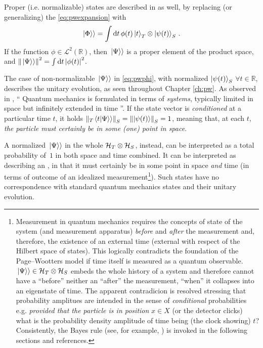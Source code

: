 Proper (i.e. normalizable) states are described in \citereset\cite{Lloyd:Time} as well, by replacing (or generalizing)
the \eqref{eq:pwexpansion} with
\begin{equation}\label{eq:pwphi}
  \left.\left| \Phi \right\rangle\right\rangle =
    \int \dd{t} \phi(t) \ket{t}_T \otimes \ket{\psi(t)}_S \, \text{.}
\end{equation}
If the function $\phi \in \mathscr{L}^2(\mathbb{R})$,
then $\left.\left| \Psi \right\rangle\right\rangle$ is a proper element of the product space,
and $\norm{\left.\left| \Psi \right\rangle\right\rangle}^2 = \int \dd{t} \abs{\phi(t)}^2$.

The case of non-normalizable $\left.\left| \Psi \right\rangle\right\rangle$ in \eqref{eq:pwphi},
with normalized $\ket{\psi(t)}_S$ $\forall t \in \mathbb{R}$,
describes the unitary evolution, as seen throughout Chapter \ref{ch:pw}.
As observed in \cite{Maccone:QGR},
``%
  Quantum mechanics is formulated in terms of \emph{systems},
  typically limited in space but infinitely extended in time%
''.
If the state vector is \emph{conditioned} at a particular time $t$,
it holds $\norm{_{T}\!\left.\left\langle t \middle| \Psi \right\rangle\right\rangle}_S = \norm{\ket{\psi(t)}}_S = 1$,
meaning that, at each $t$,
\emph{the particle must certainly be in some (one) point in space}.

A normalized $\left.\left| \Psi \right\rangle\right\rangle$ in the whole $\mathcal{H}_T \otimes \mathcal{H}_S$,
instead,
can be interpreted as a total probability of~$1$ in both space and time combined.
It can be interpreted as describing an ,
in that it
must certainly be in some point in space
\emph{and} time (in terms of outcome of an idealized measurement\footnote{
  Measurement in quantum mechanics requires the concepts
  of state of the system
  (and measurement apparatus)
  \emph{before} and \emph{after} the measurement and, therefore, the existence
  of an external time (external with respect of the Hilbert space of states).
  This logically contradicts the foundation of the Page--Wootters model if
  time itself is measured as a quantum observable. $\left.\left| \Psi \right\rangle\right\rangle \in \mathcal{H}_T \otimes \mathcal{H}_S$
  embeds the whole history of a system and therefore cannot have a
  ``before'' neither an ``after'' the measurement, ``when'' it collapses
  into an eigenstate of time. The apparent contradicion is resolved
  stressing that probability amplitues are intended in the sense of
  \emph{conditional} probabilities e.g. \emph{provided that the particle
  is in position} $x \in X$ (or the detector clicks)
  what is the probability density amplitude of time being (the clock showing) $t$?
  Consistently, the Bayes rule
  (see, for example, \cite{Stat:Conditional})
  is invoked in the following sections
  and references.
}).
Such states have no correspondence with standard quantum mechanics states and their unitary evolution.